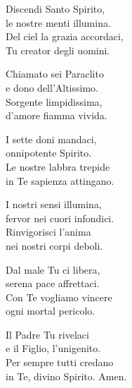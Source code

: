  
\strofa Discendi Santo Spirito,\\
le nostre menti illumina.\\
Del ciel la grazia accordaci,\\
Tu creator degli uomini.

\spazio

\strofa Chiamato sei Paraclito\\
e dono dell'Altissimo.\\
Sorgente limpidissima,\\
d'amore fiamma vivida.

\spazio

\strofa I sette doni mandaci,\\
onnipotente Spirito.\\
Le nostre labbra trepide\\
in Te sapienza attingano.

\spazio

\strofa I nostri sensi illumina,\\
fervor nei cuori infondici.\\
Rinvigorisci l'anima\\
nei nostri corpi deboli.

\spazio

\strofa Dal male Tu ci libera,\\
serena pace affrettaci.\\
Con Te vogliamo vincere\\
ogni mortal pericolo.

\spazio

\strofa Il Padre Tu rivelaci\\
e il Figlio, l'unigenito.\\
Per sempre tutti credano\\
in Te, divino Spirito. Amen.
